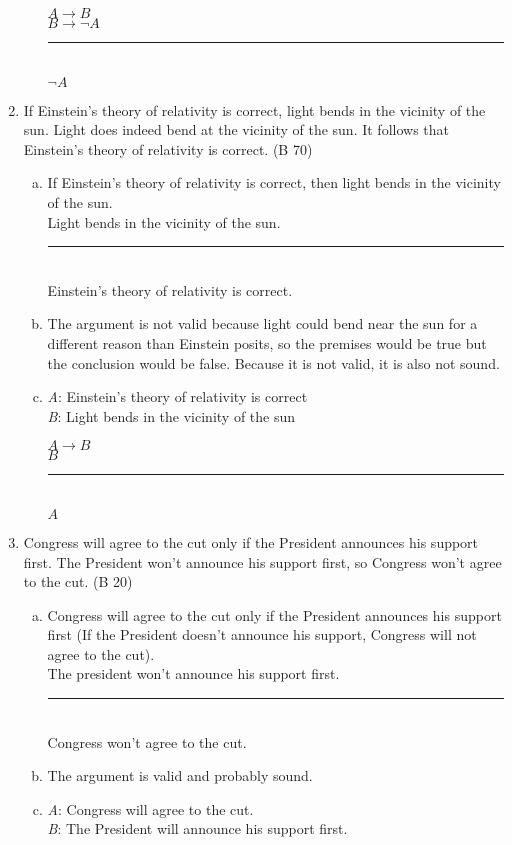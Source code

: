 \documentclass{article}
\begin{document}
\begin{enumerate}
\begin{enumerate}[(a)]
                    $A \to B$\\
                    $B \to \neg A$\\
                    \rule{5em}{.5pt}\\
                    $\neg A$
          \end{enumerate}
    \item If Einstein's theory of relativity is correct, light bends in the vicinity of the sun. Light does indeed bend at the vicinity of the sun. It follows that Einstein's theory of relativity is correct. (B 70)
          \begin{enumerate}[(a)]
              \item If Einstein's theory of relativity is correct, then light bends in the vicinity of the sun.\\
                    Light bends in the vicinity of the sun.\\
                    \rule{15em}{.5pt}\\
                    Einstein's theory of relativity is correct.
              \item The argument is not valid because light could bend near the sun for a different reason than Einstein posits, so the premises would be true but the conclusion would be false. Because it is not valid, it is also not sound.
              \item \textit{A}: Einstein's theory of relativity is correct\\
                    \textit{B}: Light bends in the vicinity of the sun

                    $A \to B$\\
                    $B$\\
                    \rule{5em}{.5pt}\\
                    $A$
          \end{enumerate}
    \item Congress will agree to the cut only if the President announces his support first. The President won't announce his support first, so Congress won't agree to the cut. (B 20)
          \begin{enumerate}[(a)]
              \item Congress will agree to the cut only if the President announces his support first (If the President doesn't announce his support, Congress will not agree to the cut).\\
                    The president won't announce his support first.\\
                    \rule{15em}{.5pt}\\
                    Congress won't agree to the cut.
              \item The argument is valid and probably sound.
              \item \textit{A}: Congress will agree to the cut.\\
                    \textit{B}: The President will announce his support first.\\


\end{enumerate}
\end{enumerate}
\end{document}
